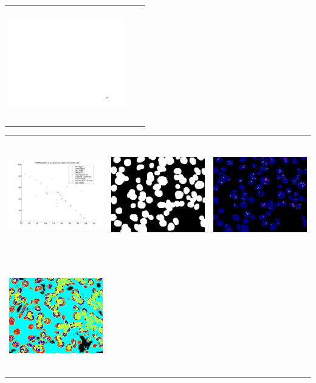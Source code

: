 \begin{tabular}{ |c|c|c| }
\includegraphics[width=5.0cm,height=5.0cm]{images/MachineVision/MachineVision_Pathology_ExampleSlides_Page_16.jpg}
\end{tabular}


\begin{tabular}{ |c|c|c| }
\includegraphics[width=5.0cm,height=5.0cm]{images/Her2Fish/1_abConvexHull.jpg}  &
\includegraphics[width=5.0cm,height=5.0cm]{images/Her2Fish/1_Processedlabelimage.jpg}   &
\includegraphics[width=5.0cm,height=5.0cm]{images/Her2Fish/1_RGBMASK.jpg}  \\
\includegraphics[width=5.0cm,height=5.0cm]{images/Her2Fish/1_RGB_LabelImg.jpg}  &

\end{tabular}
